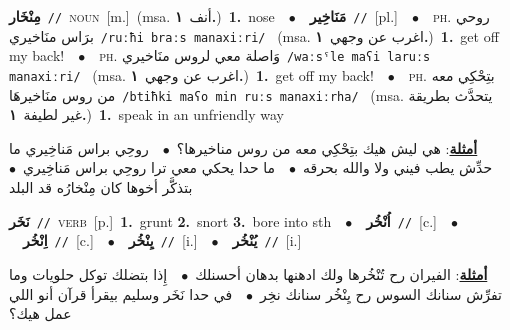 \documentclass[10pt,a4paper,twoside]{article} %
\begin{document}
\begin{multicols}{2}
{\setlength\topsep{0pt}\textbf{\foreignlanguage{arabic}{مِنْخَار}}\ {\color{gray}\texttt{//}\color{black}}\ \textsc{noun}\ [m.]\ \color{gray}(msa. \foreignlanguage{arabic}{أنف}~\foreignlanguage{arabic}{\textbf{١.}})\color{black}\ \textbf{1.}~nose\ \ $\bullet$\ \ \setlength\topsep{0pt}\textbf{\foreignlanguage{arabic}{مَنَاخِير}}\ {\color{gray}\texttt{//}\color{black}}\ [pl.]\ \ $\bullet$\ \ \textsc{ph.} \color{gray} \foreignlanguage{arabic}{روحي برَاس منَاخيري}\color{black}\ {\color{gray}\texttt{/{\sffamily ruːħi braːs manaxiːri}/}\color{black}}\ \color{gray} (msa. \foreignlanguage{arabic}{اغرب عن وجهي}~\foreignlanguage{arabic}{\textbf{١.}})\color{black}\ \textbf{1.}~get off my back!\ \ $\bullet$\ \ \textsc{ph.} \color{gray} \foreignlanguage{arabic}{وَاصلة معي لروس منَاخيري}\color{black}\ {\color{gray}\texttt{/{\sffamily waːsˤle maʕi laruːs manaxiːri}/}\color{black}}\ \color{gray} (msa. \foreignlanguage{arabic}{اغرب عن وجهي}~\foreignlanguage{arabic}{\textbf{١.}})\color{black}\ \textbf{1.}~get off my back!\ \ $\bullet$\ \ \textsc{ph.} \color{gray} \foreignlanguage{arabic}{بتِحْكِي معه من روس منَاخيرهَا}\color{black}\ {\color{gray}\texttt{/{\sffamily btiħki maʕo min ruːs manaxiːrha}/}\color{black}}\ \color{gray} (msa. \foreignlanguage{arabic}{يتحدَّث بطريقة غير لطيفة}~\foreignlanguage{arabic}{\textbf{١.}})\color{black}\ \textbf{1.}~speak in an unfriendly way\  \begin{flushright}\color{gray}\foreignlanguage{arabic}{\textbf{\underline{\foreignlanguage{arabic}{أمثلة}}}: هي ليش هيك بتِحْكِي معه من روس مناخيرها؟\ $\bullet$\ \  روحِي براس مَناخِيري ما حدِّش يطب فيني ولا والله بحرقه\ $\bullet$\ \  ما حدا يحكي معي ترا روحِي براس مَناخِيري\ $\bullet$\ \  بتذكَّر أخوها كان مِنْخارُه قد البلد}\end{flushright}\color{black}} \vspace{2mm}

{\setlength\topsep{0pt}\textbf{\foreignlanguage{arabic}{نَخَر}}\ {\color{gray}\texttt{//}\color{black}}\ \textsc{verb}\ [p.]\ \textbf{1.}~grunt  \textbf{2.}~snort  \textbf{3.}~bore into sth\ \ $\bullet$\ \ \setlength\topsep{0pt}\textbf{\foreignlanguage{arabic}{اُنْخُر}}\ {\color{gray}\texttt{//}\color{black}}\ [c.]\ \ $\bullet$\ \ \setlength\topsep{0pt}\textbf{\foreignlanguage{arabic}{اِنْخُر}}\ {\color{gray}\texttt{//}\color{black}}\ [c.]\ \ $\bullet$\ \ \setlength\topsep{0pt}\textbf{\foreignlanguage{arabic}{يِنْخُر}}\ {\color{gray}\texttt{//}\color{black}}\ [i.]\ \ $\bullet$\ \ \setlength\topsep{0pt}\textbf{\foreignlanguage{arabic}{يُنْخُر}}\ {\color{gray}\texttt{//}\color{black}}\ [i.]\  \begin{flushright}\color{gray}\foreignlanguage{arabic}{\textbf{\underline{\foreignlanguage{arabic}{أمثلة}}}: الفيران رح تُنْخُرها ولك ادهنها بدهان أحسنلك\ $\bullet$\ \  إِذا بتضلك توكل حلويات وما تفرِّش سنانك السوس رح يِنْخُر سنانك نخِر\ $\bullet$\ \  في حدا نَخَر وسليم بيقرأ قرآن أنو اللي عمل هيك؟}\end{flushright}\color{black}} \vspace{2mm}


\end{multicols}
\end{document}
